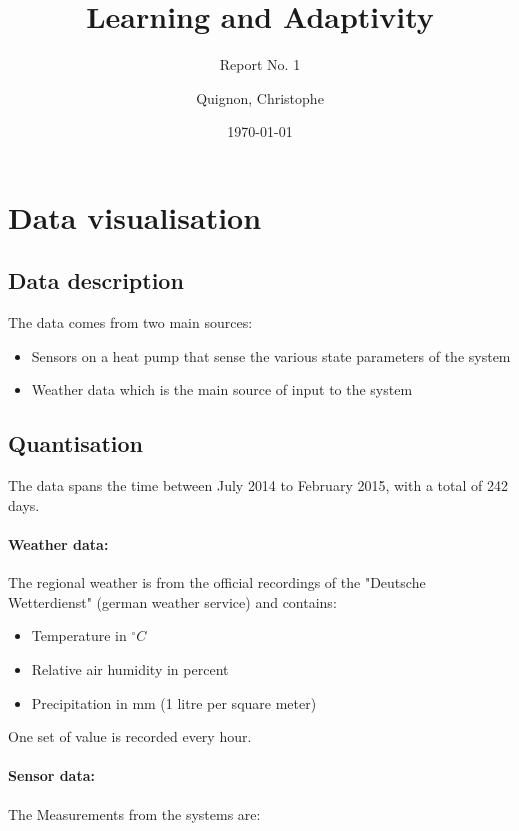 \documentclass{scrartcl}
\begin{document}
\title{Learning and Adaptivity}
\subtitle{Report No. 1}
\author{
  Quignon, Christophe
}
\date{\today}


\maketitle


\section{Data visualisation}
\subsection{Data description}
The data comes from two main sources:
\begin{itemize}
\item Sensors on a heat pump that sense the various state parameters of the system
\item Weather data which is the main source of input to the system
\end{itemize}


\subsection{Quantisation}
The data spans the time between July 2014 to February 2015, with a total of 242 days.

\paragraph{Weather data:}
The regional weather is from the official recordings of the "Deutsche Wetterdienst" (german weather service) and contains:

\begin{itemize}
\item Temperature in $^\circ C$
\item Relative air humidity in percent
\item Precipitation in mm (1 litre per square meter)
\end{itemize}

One set of value is recorded every hour.

\paragraph{Sensor data:}
The Measurements from the systems are:
\end{document}
